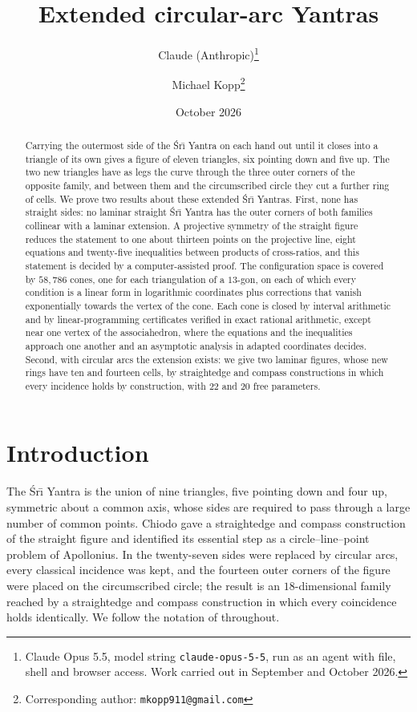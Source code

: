 \documentclass[11pt,a4paper]{article}
\title{Extended circular-arc \Sri{} Yantras}
\author{Claude (Anthropic)\thanks{Claude Opus 5.5, model string \texttt{claude-opus-5-5}, run as an agent
with file, shell and browser access. Work carried out in September and October 2026.}
\and Michael Kopp\thanks{Corresponding author: \texttt{mkopp911@gmail.com}}}
\date{October 2026}
\theoremstyle{definition}
\theoremstyle{remark}
\newcommand{\Sri}{\'Sr\={\i}}
\begin{document}
\maketitle

\begin{abstract}
\noindent
Carrying the outermost side of the \Sri{} Yantra on each hand out until it closes into a triangle of
its own gives a figure of eleven triangles, six pointing down and five up. The two new triangles have as
legs the curve through the three outer corners of the opposite family, and between them and the
circumscribed circle they cut a further ring of cells. We prove two results about these extended
\Sri{} Yantras. First, none has straight sides: no laminar straight \Sri{} Yantra has the outer corners of
both families collinear with a laminar extension. A projective symmetry of the straight figure reduces
the statement to one about thirteen points on the projective line, eight equations and twenty-five
inequalities between products of cross-ratios, and this statement is decided by a computer-assisted
proof. The configuration space is covered by $58{,}786$ cones, one for each triangulation of a
$13$-gon, on each of which every condition is a linear form in logarithmic coordinates plus corrections
that vanish exponentially towards the vertex of the cone. Each cone is closed by interval arithmetic and
by linear-programming certificates verified in exact rational arithmetic, except near one vertex of the
associahedron, where the equations and the inequalities approach one another and an asymptotic analysis
in adapted coordinates decides. Second, with circular arcs the extension exists: we give two laminar
figures, whose new rings have ten and fourteen cells, by straightedge and compass constructions in which
every incidence holds by construction, with $22$ and $20$ free parameters.
\end{abstract}

\section{Introduction}

The \Sri{} Yantra is the union of nine triangles, five pointing down and four up, symmetric about a
common axis, whose sides are required to pass through a large number of common points. Chiodo
\cite{Chiodo} gave a straightedge and compass construction of the straight figure and identified its
essential step as a circle--line--point problem of Apollonius. In \cite{CK} the twenty-seven sides were
replaced by circular arcs, every classical incidence was kept, and the fourteen outer corners of the
figure were placed on the circumscribed circle; the result is an $18$-dimensional family reached by a
straightedge and compass construction in which every coincidence holds identically. We follow the
notation of \cite{Chiodo,CK} throughout.
\end{document}
